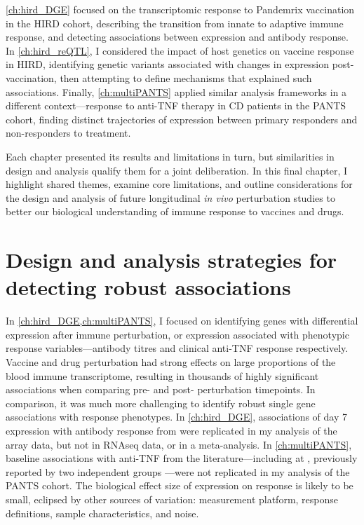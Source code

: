 \cref{ch:hird_DGE} focused on the transcriptomic response to Pandemrix vaccination in the \gls{HIRD} cohort,
describing the transition from innate to adaptive immune response,
and detecting associations between expression and antibody response.
In \cref{ch:hird_reQTL}, 
I considered the impact of host genetics on vaccine response in \gls{HIRD},
identifying genetic variants associated with changes in expression post-vaccination,
then attempting to define mechanisms that explained such associations.
Finally, \cref{ch:multiPANTS} applied similar analysis frameworks in a different context---response to anti-\gls{TNF} therapy in \gls{CD} patients in the \gls{PANTS} cohort,
finding distinct trajectories of expression between primary responders and non-responders to treatment. 

Each chapter presented its results and limitations in turn,
but similarities in design and analysis qualify them for a joint deliberation.
In this final chapter,
I highlight shared themes,
examine core limitations,
and outline considerations for the design and analysis of future longitudinal \textit{in vivo} perturbation studies
to better our biological understanding of immune response to vaccines and drugs.

\section{Design and analysis strategies for detecting robust associations}

In \cref{ch:hird_DGE,ch:multiPANTS}, I focused on identifying genes with differential expression after immune perturbation, 
or expression associated with phenotypic response variables---antibody titres and clinical anti-\gls{TNF} response respectively.
Vaccine and drug perturbation had strong effects on large proportions of the blood immune transcriptome, 
resulting in thousands of highly significant associations when comparing pre- and post- perturbation timepoints.
In comparison, it was much more challenging to identify robust single gene associations with response phenotypes.
In \cref{ch:hird_DGE}, associations of day 7 expression with antibody response from \textcite{sobolev2016AdjuvantedInfluenzaH1N1Vaccination} were replicated in my analysis of the array data, but not in \gls{RNAseq} data, or in a meta-analysis.
In \cref{ch:multiPANTS}, baseline associations with anti-\gls{TNF} from the literature---including at , previously reported by two independent groups \autocite{gaujoux2019CellcentredMetaanalysisReveals,verstockt2019LowTREM1Expression}---were not replicated in my analysis of the \gls{PANTS} cohort.
The biological effect size of expression on response is likely to be small, eclipsed by other sources of variation: 
measurement platform, response definitions, sample characteristics, and noise.

